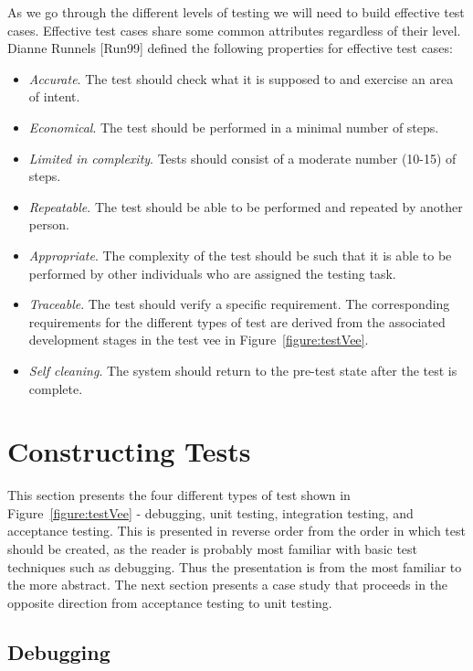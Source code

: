 As we go through the different levels of testing we will need to build
effective test cases. Effective test cases share some common attributes
regardless of their level. Dianne Runnels {[}Run99{]} defined the
following properties for effective test cases:

\begin{itemize}
\item
  \emph{Accurate}. The test should check what it is supposed to and
  exercise an area of intent.
\item
  \emph{Economical}. The test should be performed in a minimal number of
  steps.
\item
  \emph{Limited in complexity}. Tests should consist of a moderate
  number (10-15) of steps.
\item
  \emph{Repeatable}. The test should be able to be performed and
  repeated by another person.
\item
  \emph{Appropriate}. The complexity of the test should be such that it
  is able to be performed by other individuals who are assigned the
  testing task.
\item
  \emph{Traceable}. The test should verify a specific requirement. The
  corresponding requirements for the different types of test are derived
  from the associated development stages in the test vee in 
  Figure~\ref{figure:testVee}.
\item
  \emph{Self cleaning}. The system should return to the pre-test state
  after the test is complete.
\end{itemize}

\section{Constructing Tests}
\label{section:constructing-tests}

This section presents the four different types of test shown in 
Figure~\ref{figure:testVee} - 
debugging, unit testing, integration testing, and acceptance
testing. This is presented in reverse order from the order in which test
should be created, as the reader is probably most familiar with basic
test techniques such as debugging. Thus the presentation is from the
most familiar to the more abstract. The next section presents a case
study that proceeds in the opposite direction from acceptance testing to
unit testing.

\subsection{Debugging}
\label{subsection:debugging}

